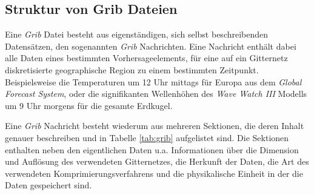 \subsection{Struktur von Grib Dateien}

Eine \textit{Grib} Datei besteht aus eigenständigen, sich selbst
beschreibenden Datensätzen, den sogenannten \textit{Grib}
Nachrichten. Eine Nachricht enthält dabei alle Daten eines bestimmten
Vorhersageelements, für eine auf ein Gitternetz diskretisierte
geographische Region zu einem bestimmten Zeitpunkt. Beispielsweise die
Temperaturen um 12 Uhr mittags für Europa aus dem \textit{Global
  Forecast System}, oder die signifikanten Wellenhöhen des
\textit{Wave Watch III} Modells um 9 Uhr morgens für die gesamte
Erdkugel.

Eine \textit{Grib} Nachricht besteht wiederum aus mehreren Sektionen,
die deren Inhalt genauer beschreiben und in Tabelle \ref{tab:grib}
aufgelistet sind. Die Sektionen enthalten neben den eigentlichen Daten
u.a. Informationen über die Dimension und Auflösung des verwendeten
Gitternetzes, die Herkunft der Daten, die Art des verwendeten
Komprimierungsverfahrens und die physikalische Einheit in der die
Daten gespeichert sind.

